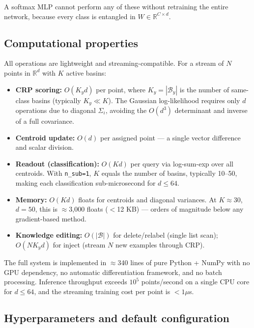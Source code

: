 \documentclass[11pt,a4paper]{article}
\begin{document}
A softmax MLP cannot perform any of these without retraining the entire network, because every class is entangled in $W\in\mathbb{R}^{C\times d}$.

\subsection{Computational properties}

All operations are lightweight and streaming-compatible. For a stream of $N$ points in $\mathbb{R}^d$ with $K$ active basins:

\begin{itemize}[leftmargin=*]
\item \textbf{CRP scoring:} $O(K_y d)$ per point, where $K_y = |\mathcal{B}_y|$ is the number of same-class basins (typically $K_y \ll K$). The Gaussian log-likelihood requires only $d$ operations due to diagonal $\Sigma_i$, avoiding the $O(d^3)$ determinant and inverse of a full covariance.
\item \textbf{Centroid update:} $O(d)$ per assigned point --- a single vector difference and scalar division.
\item \textbf{Readout (classification):} $O(K d)$ per query via log-sum-exp over all centroids. With \texttt{n\_sub=1}, $K$ equals the number of basins, typically 10--50, making each classification sub-microsecond for $d \le 64$.
\item \textbf{Memory:} $O(K d)$ floats for centroids and diagonal variances. At $K \approx 30$, $d = 50$, this is $\approx$3,000 floats ($<$12 KB) --- orders of magnitude below any gradient-based method.
\item \textbf{Knowledge editing:} $O(|\mathcal{B}|)$ for delete/relabel (single list scan); $O(N K_y d)$ for inject (stream $N$ new examples through CRP).
\end{itemize}

The full system is implemented in $\approx$340 lines of pure Python + NumPy with no GPU dependency, no automatic differentiation framework, and no batch processing. Inference throughput exceeds $10^5$ points/second on a single CPU core for $d \le 64$, and the streaming training cost per point is $<$$1\mu$s.

\subsection{Hyperparameters and default configuration}
\end{document}
